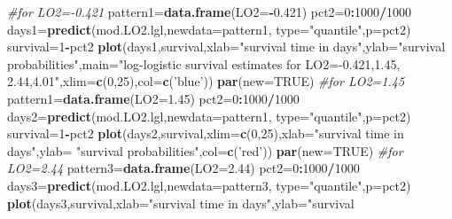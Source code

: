\documentclass[]{article}
\newenvironment{Shaded}{\begin{snugshade}}{\end{snugshade}}
\newcommand{\CommentTok}[1]{\textcolor[rgb]{0.56,0.35,0.01}{\textit{#1}}}
\newcommand{\DataTypeTok}[1]{\textcolor[rgb]{0.13,0.29,0.53}{#1}}
\newcommand{\DecValTok}[1]{\textcolor[rgb]{0.00,0.00,0.81}{#1}}
\newcommand{\FloatTok}[1]{\textcolor[rgb]{0.00,0.00,0.81}{#1}}
\newcommand{\KeywordTok}[1]{\textcolor[rgb]{0.13,0.29,0.53}{\textbf{#1}}}
\newcommand{\NormalTok}[1]{#1}
\newcommand{\OperatorTok}[1]{\textcolor[rgb]{0.81,0.36,0.00}{\textbf{#1}}}
\newcommand{\OtherTok}[1]{\textcolor[rgb]{0.56,0.35,0.01}{#1}}
\newcommand{\StringTok}[1]{\textcolor[rgb]{0.31,0.60,0.02}{#1}}
\begin{document}
\begin{Shaded}
\begin{Highlighting}[]
\CommentTok{#for LO2=-0.421}
\NormalTok{pattern1=}\KeywordTok{data.frame}\NormalTok{(}\DataTypeTok{LO2=}\OperatorTok{-}\FloatTok{0.421}\NormalTok{)}
\NormalTok{pct2=}\DecValTok{0}\OperatorTok{:}\DecValTok{1000}\OperatorTok{/}\DecValTok{1000}
\NormalTok{days1=}\KeywordTok{predict}\NormalTok{(mod.LO2.lgl,}\DataTypeTok{newdata=}\NormalTok{pattern1,}
              \DataTypeTok{type=}\StringTok{"quantile"}\NormalTok{,}\DataTypeTok{p=}\NormalTok{pct2)}
\NormalTok{survival=}\DecValTok{1}\OperatorTok{-}\NormalTok{pct2}
\KeywordTok{plot}\NormalTok{(days1,survival,}\DataTypeTok{xlab=}\StringTok{"survival time in days"}\NormalTok{,}\DataTypeTok{ylab=}\StringTok{"survival}
\StringTok{     probabilities"}\NormalTok{,}\DataTypeTok{main=}\StringTok{"log-logistic survival estimates for LO2=-0.421,1.45, 2.44,4.01"}\NormalTok{,}\DataTypeTok{xlim=}\KeywordTok{c}\NormalTok{(}\DecValTok{0}\NormalTok{,}\DecValTok{25}\NormalTok{),}\DataTypeTok{col=}\KeywordTok{c}\NormalTok{(}\StringTok{'blue'}\NormalTok{))}
\KeywordTok{par}\NormalTok{(}\DataTypeTok{new=}\OtherTok{TRUE}\NormalTok{)}
\CommentTok{#for LO2=1.45}
\NormalTok{pattern1=}\KeywordTok{data.frame}\NormalTok{(}\DataTypeTok{LO2=}\FloatTok{1.45}\NormalTok{)}
\NormalTok{pct2=}\DecValTok{0}\OperatorTok{:}\DecValTok{1000}\OperatorTok{/}\DecValTok{1000}
\NormalTok{days2=}\KeywordTok{predict}\NormalTok{(mod.LO2.lgl,}\DataTypeTok{newdata=}\NormalTok{pattern1,}
              \DataTypeTok{type=}\StringTok{"quantile"}\NormalTok{,}\DataTypeTok{p=}\NormalTok{pct2)}
\NormalTok{survival=}\DecValTok{1}\OperatorTok{-}\NormalTok{pct2}
\KeywordTok{plot}\NormalTok{(days2,survival,}\DataTypeTok{xlim=}\KeywordTok{c}\NormalTok{(}\DecValTok{0}\NormalTok{,}\DecValTok{25}\NormalTok{),}\DataTypeTok{xlab=}\StringTok{"survival time in days"}\NormalTok{,}\DataTypeTok{ylab=} \StringTok{"survival probabilities"}\NormalTok{,}\DataTypeTok{col=}\KeywordTok{c}\NormalTok{(}\StringTok{'red'}\NormalTok{))}
\KeywordTok{par}\NormalTok{(}\DataTypeTok{new=}\OtherTok{TRUE}\NormalTok{)}
\CommentTok{#for LO2=2.44}
\NormalTok{pattern3=}\KeywordTok{data.frame}\NormalTok{(}\DataTypeTok{LO2=}\FloatTok{2.44}\NormalTok{)}
\NormalTok{pct2=}\DecValTok{0}\OperatorTok{:}\DecValTok{1000}\OperatorTok{/}\DecValTok{1000}
\NormalTok{days3=}\KeywordTok{predict}\NormalTok{(mod.LO2.lgl,}\DataTypeTok{newdata=}\NormalTok{pattern3,}
              \DataTypeTok{type=}\StringTok{"quantile"}\NormalTok{,}\DataTypeTok{p=}\NormalTok{pct2)}
\KeywordTok{plot}\NormalTok{(days3,survival,}\DataTypeTok{xlab=}\StringTok{"survival time in days"}\NormalTok{,}\DataTypeTok{ylab=}\StringTok{"survival}

\end{Highlighting}
\end{Shaded}
\end{document}
